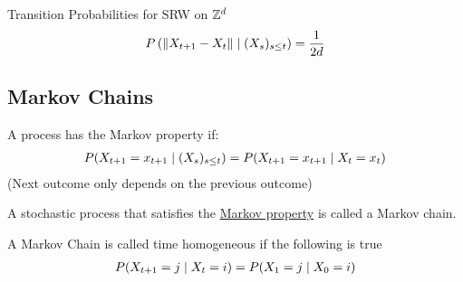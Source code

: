 \documentclass[12pt,a4paper]{article}
\begin{document}
\begin{example}{Transition Probabilities for SRW on $\mathbb{Z}^d$}
\begin{align*}
P\left(\norm{X_{t+1} - X_{t}} \;\vert\; (X_{s})_{s \leq t} \right) = \frac{1}{2d} 
\end{align*}
\end{example}
\newpage
\subsection{Markov Chains}
\begin{defn}
\label{markovprop}
A process has the Markov property if:
\begin{align*}
P(X_{t+1}= x_{t+1} \;\vert\; (X_{s})_{s\leq t}) = P(X_{t+1} = x_{t+1} \;\vert\; X_{t} = x_t)
\end{align*}
(Next outcome only depends on the previous outcome)
\end{defn}

\begin{note}
A stochastic process that satisfies the \hyperref[markovprop]{Markov property} is called a Markov chain.
\end{note}

\begin{defn}
A Markov Chain is called time homogeneous if the following is true
\begin{align*}
P(X_{t+1} = j \;\vert\; X_t = i) = P(X_1 = j \;\vert\; X_0 = i)
\end{align*}
\end{defn}
\end{document}
